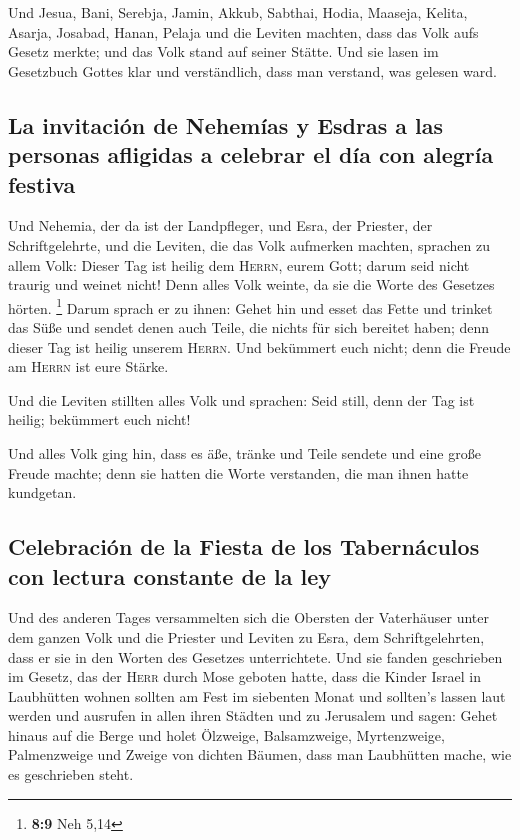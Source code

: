 Und Jesua, Bani, Serebja, Jamin, Akkub, Sabthai, Hodia,
Maaseja, Kelita, Asarja, Josabad, Hanan, Pelaja und die Leviten machten,
dass das Volk aufs Gesetz merkte; und das Volk stand auf seiner Stätte.
 Und sie lasen im Gesetzbuch Gottes klar und verständlich,
dass man verstand, was gelesen ward.

\hypertarget{la-invitaciuxf3n-de-nehemuxedas-y-esdras-a-las-personas-afligidas-a-celebrar-el-duxeda-con-alegruxeda-festiva}{%
\subsection{La invitación de Nehemías y Esdras a las personas afligidas
a celebrar el día con alegría
festiva}\label{la-invitaciuxf3n-de-nehemuxedas-y-esdras-a-las-personas-afligidas-a-celebrar-el-duxeda-con-alegruxeda-festiva}}

 Und Nehemia, der da ist der Landpfleger, und Esra, der
Priester, der Schriftgelehrte, und die Leviten, die das Volk aufmerken
machten, sprachen zu allem Volk: Dieser Tag ist heilig dem
\textsc{Herrn}, eurem Gott; darum seid nicht traurig und weinet nicht!
Denn alles Volk weinte, da sie die Worte des Gesetzes hörten.
\footnote{\textbf{8:9} Neh 5,14}  Darum sprach er zu
ihnen: Gehet hin und esset das Fette und trinket das Süße und sendet
denen auch Teile, die nichts für sich bereitet haben; denn dieser Tag
ist heilig unserem \textsc{Herrn}. Und bekümmert euch nicht; denn die
Freude am \textsc{Herrn} ist eure Stärke.

 Und die Leviten stillten alles Volk und sprachen: Seid
still, denn der Tag ist heilig; bekümmert euch nicht!

 Und alles Volk ging hin, dass es äße, tränke und Teile
sendete und eine große Freude machte; denn sie hatten die Worte
verstanden, die man ihnen hatte kundgetan.

\hypertarget{celebraciuxf3n-de-la-fiesta-de-los-tabernuxe1culos-con-lectura-constante-de-la-ley}{%
\subsection{Celebración de la Fiesta de los Tabernáculos con lectura
constante de la
ley}\label{celebraciuxf3n-de-la-fiesta-de-los-tabernuxe1culos-con-lectura-constante-de-la-ley}}

 Und des anderen Tages versammelten sich die Obersten der
Vaterhäuser unter dem ganzen Volk und die Priester und Leviten zu Esra,
dem Schriftgelehrten, dass er sie in den Worten des Gesetzes
unterrichtete.  Und sie fanden geschrieben im Gesetz, das
der \textsc{Herr} durch Mose geboten hatte, dass die Kinder Israel in
Laubhütten wohnen sollten am Fest im siebenten Monat  und
sollten's lassen laut werden und ausrufen in allen ihren Städten und zu
Jerusalem und sagen: Gehet hinaus auf die Berge und holet Ölzweige,
Balsamzweige, Myrtenzweige, Palmenzweige und Zweige von dichten Bäumen,
dass man Laubhütten mache, wie es geschrieben steht.

